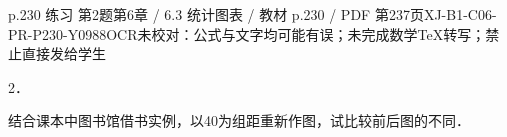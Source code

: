 \begin{bankitem}{p.230 练习 第2题}{第6章 / 6.3 统计图表 / 教材 p.230 / PDF 第237页}{XJ-B1-C06-PR-P230-Y0988}{OCR未校对：公式与文字均可能有误；未完成数学TeX转写；禁止直接发给学生}
\begin{ocrdraft}
\par
2．
\par
结合课本中图书馆借书实例，以40为组距重新作图，试比较前后图的不同．
\end{ocrdraft}
\end{bankitem}
